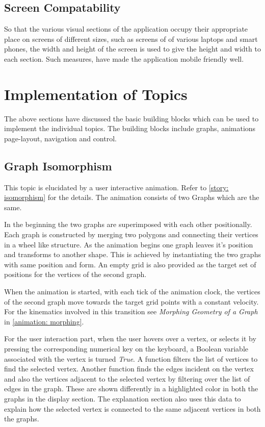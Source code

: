 \subsection{Screen Compatability}
So that the various visual sections of the application occupy their appropriate
place on screens of different sizes, such as screens of of various laptops and
smart phones, the width and height of the screen is used to give the height and
width to each section.  Such measures, have made the application mobile
friendly well.

\section{Implementation of Topics}
The above sections have discussed the basic building blocks which can be used
to implement the individual topics. The building blocks include graphs, animations
page-layout, navigation and control.

\subsection{Graph Isomorphism}
\label{impl: isomporphism}

This topic is elucidated by a user interactive animation. Refer to
\autoref{story: isomorphism} for the details. The animation consists of two
Graphs which are the same. 

In the beginning the two graphs are superimposed with each other positionally.
Each graph is constructed by merging two polygons and connecting their vertices
in a wheel like structure.
As the animation begins one graph leaves it's position and transforms to
another shape.  This is achieved by instantiating the two graphs with same
position and form. An empty grid is also provided as the target set of
positions for the vertices of the second graph. 

When the animation is started, with each tick of the animation clock, the
vertices of the second graph move towards the target grid points with a
constant velocity. For the kinematics involved in this transition see
\emph{Morphing Geometry of a Graph} in \autoref{animation: morphing}.

For the user interaction part, when the user hovers over a vertex, or selects
it by pressing the corresponding numerical key on the keyboard, a Boolean
variable associated with the vertex is turned \emph{True}. A function filters
the list of vertices to find the selected vertex. Another function finds the
edges incident on the vertex and also the vertices adjacent to the selected
vertex by filtering over the list of edges in the graph. These are shown
differently in a highlighted color in both the graphs in the display section.
The explanation section also uses this data to explain how the selected vertex
is connected to the same adjacent vertices in both the graphs.

